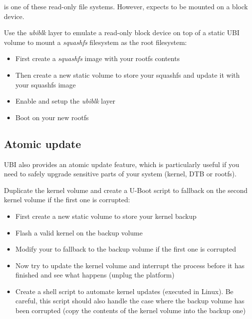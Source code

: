  is one of these read-only file systems. However,
 expects to be mounted on a block device.

Use the {\em ubiblk} layer to emulate a read-only block device on top
of a static UBI volume to mount a {\em squashfs} filesystem as the
root filesystem:

\begin{itemize}
  \item First create a {\em squashfs} image with your rootfs contents
  \item Then create a new static volume to store your squashfs and update it with
    your squashfs image
  \item Enable and setup the {\em ubiblk} layer
  \item Boot on your new rootfs
\end{itemize}


\subsection{Atomic update}

UBI also provides an atomic update feature, which is particularly useful
if you need to safely upgrade sensitive parts of your system (kernel,
DTB or rootfs).

Duplicate the kernel volume and create a U-Boot script to fallback on
the second kernel volume if the first one is corrupted:
\begin{itemize}
  \item First create a new static volume to store your kernel backup
  \item Flash a valid kernel on the backup volume
  \item Modify your  to fallback to the backup volume if the first one
    is corrupted
  \item Now try to update the kernel volume and interrupt the process before
    it has finished and see what happens (unplug the platform)
  \item Create a shell script to automate kernel updates (executed in Linux).
    Be careful, this script should also handle the case where the backup
    volume has been corrupted (copy the contents of the kernel volume into
    the backup one)
\end{itemize}


